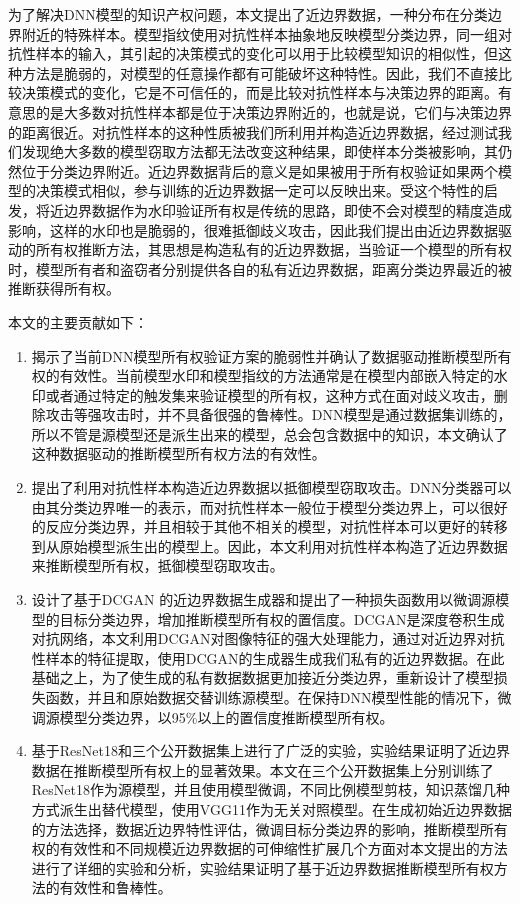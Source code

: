 为了解决DNN模型的知识产权问题，本文提出了近边界数据，一种分布在分类边界附近的特殊样本。模型指纹\cite{cao2021ipguard}使用对抗性样本抽象地反映模型分类边界，同一组对抗性样本的输入，其引起的决策模式的变化可以用于比较模型知识的相似性，但这种方法是脆弱的，对模型的任意操作都有可能破坏这种特性。因此，我们不直接比较决策模式的变化，它是不可信任的，而是比较对抗性样本与决策边界的距离。有意思的是大多数对抗性样本都是位于决策边界附近的，也就是说，它们与决策边界的距离很近。对抗性样本的这种性质被我们所利用并构造近边界数据，经过测试我们发现绝大多数的模型窃取方法都无法改变这种结果，即使样本分类被影响，其仍然位于分类边界附近。近边界数据背后的意义是如果被用于所有权验证如果两个模型的决策模式相似，参与训练的近边界数据一定可以反映出来。受这个特性的启发，将近边界数据作为水印验证所有权是传统的思路，即使不会对模型的精度造成影响，这样的水印也是脆弱的，很难抵御歧义攻击，因此我们提出由近边界数据驱动的所有权推断方法，其思想是构造私有的近边界数据，当验证一个模型的所有权时，模型所有者和盗窃者分别提供各自的私有近边界数据，距离分类边界最近的被推断获得所有权。

本文的主要贡献如下：

\begin{enumerate}
	\renewcommand{\labelenumi}{\theenumi)}
	\item 揭示了当前DNN模型所有权验证方案的脆弱性并确认了数据驱动推断模型所有权的有效性。当前模型水印和模型指纹的方法通常是在模型内部嵌入特定的水印或者通过特定的触发集来验证模型的所有权，这种方式在面对歧义攻击，删除攻击等强攻击时，并不具备很强的鲁棒性。DNN模型是通过数据集训练的，所以不管是源模型还是派生出来的模型，总会包含数据中的知识，本文确认了这种数据驱动的推断模型所有权方法的有效性。
	\item 提出了利用对抗性样本构造近边界数据以抵御模型窃取攻击。DNN分类器可以由其分类边界唯一的表示，而对抗性样本一般位于模型分类边界上，可以很好的反应分类边界，并且相较于其他不相关的模型，对抗性样本可以更好的转移到从原始模型派生出的模型上。因此，本文利用对抗性样本构造了近边界数据来推断模型所有权，抵御模型窃取攻击。
	\item 设计了基于DCGAN 的近边界数据生成器和提出了一种损失函数用以微调源模型的目标分类边界，增加推断模型所有权的置信度。DCGAN是深度卷积生成对抗网络，本文利用DCGAN对图像特征的强大处理能力，通过对近边界对抗性样本的特征提取，使用DCGAN的生成器生成我们私有的近边界数据。在此基础之上，为了使生成的私有数据数据更加接近分类边界，重新设计了模型损失函数，并且和原始数据交替训练源模型。在保持DNN模型性能的情况下，微调源模型分类边界，以95\%以上的置信度推断模型所有权。
	\item 基于ResNet18和三个公开数据集上进行了广泛的实验，实验结果证明了近边界数据在推断模型所有权上的显著效果。本文在三个公开数据集上分别训练了ResNet18作为源模型，并且使用模型微调，不同比例模型剪枝，知识蒸馏几种方式派生出替代模型，使用VGG11作为无关对照模型。在生成初始近边界数据的方法选择，数据近边界特性评估，微调目标分类边界的影响，推断模型所有权的有效性和不同规模近边界数据的可伸缩性扩展几个方面对本文提出的方法进行了详细的实验和分析，实验结果证明了基于近边界数据推断模型所有权方法的有效性和鲁棒性。
\end{enumerate}

